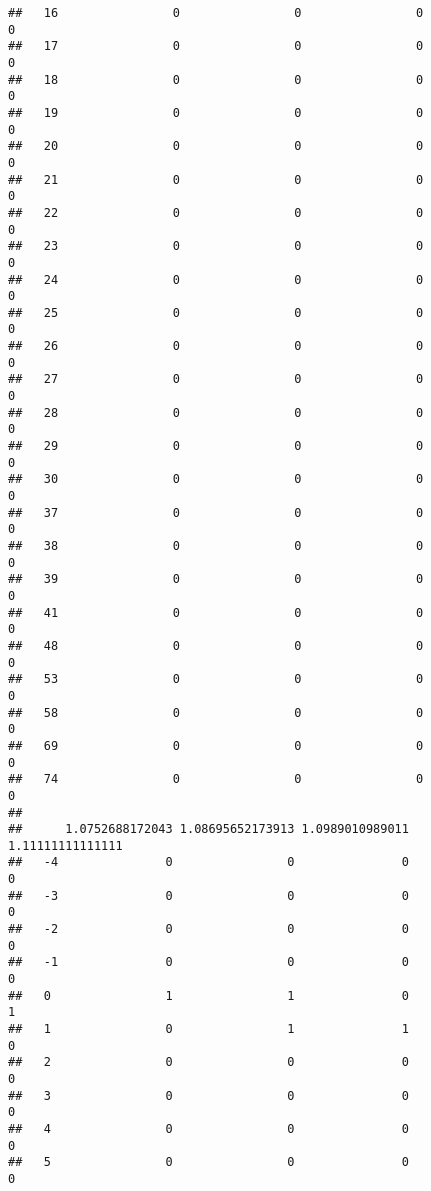 \documentclass[]{article}
\begin{document}
\begin{verbatim}
##   16                0                0                0                0
##   17                0                0                0                0
##   18                0                0                0                0
##   19                0                0                0                0
##   20                0                0                0                0
##   21                0                0                0                0
##   22                0                0                0                0
##   23                0                0                0                0
##   24                0                0                0                0
##   25                0                0                0                0
##   26                0                0                0                0
##   27                0                0                0                0
##   28                0                0                0                0
##   29                0                0                0                0
##   30                0                0                0                0
##   37                0                0                0                0
##   38                0                0                0                0
##   39                0                0                0                0
##   41                0                0                0                0
##   48                0                0                0                0
##   53                0                0                0                0
##   58                0                0                0                0
##   69                0                0                0                0
##   74                0                0                0                0
##     
##      1.0752688172043 1.08695652173913 1.0989010989011 1.11111111111111
##   -4               0                0               0                0
##   -3               0                0               0                0
##   -2               0                0               0                0
##   -1               0                0               0                0
##   0                1                1               0                1
##   1                0                1               1                0
##   2                0                0               0                0
##   3                0                0               0                0
##   4                0                0               0                0
##   5                0                0               0                0

\end{verbatim}
\end{document}
